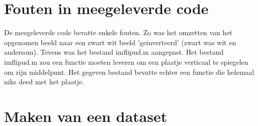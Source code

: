 \documentclass[a4paper]{article}
\begin{document}
\section{Fouten in meegeleverde code}
De meegeleverde code bevatte enkele fouten. Zo was het omzetten van het opgenomen beeld naar een zwart wit beeld 'geinverteerd' (zwart was wit en andersom). 
Tevens was het bestand imflipud.m aangepast. Het bestand imflipud.m zou een functie moeten leveren om een plaatje verticaal te spiegelen om zijn middelpunt. Het gegeven bestand bevatte echter een functie die helemaal niks deed met het plaatje.\\


\section{Maken van een dataset}
\end{document}
